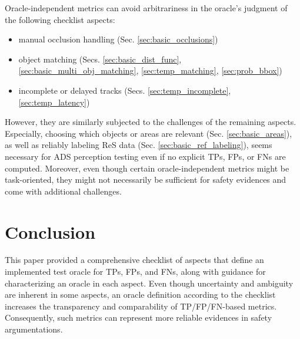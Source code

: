 \documentclass[conference]{IEEEtran}
\begin{document}
Oracle-independent metrics %
can avoid arbitrariness in the oracle's judgment of the following checklist aspects:
\begin{itemize}
\item manual occlusion handling (Sec. \ref{sec:basic_occlusions})
\item object matching (Secs. \ref{sec:basic_dist_func}, \ref{sec:basic_multi_obj_matching},
\ref{sec:temp_matching},
 \ref{sec:prob_bbox})
\item incomplete or delayed tracks (Secs. \ref{sec:temp_incomplete}, \ref{sec:temp_latency})
\end{itemize}
However, they are similarly subjected to the challenges of the remaining aspects.
Especially, choosing which objects or areas are relevant (Sec. \ref{sec:basic_areas}), as well as reliably labeling ReS data (Sec. \ref{sec:basic_ref_labeling}), seems necessary for ADS perception testing even if no explicit TPs, FPs, or FNs are computed. %
Moreover, even though certain oracle-independent metrics might be task-oriented, %
they might not necessarily be sufficient for safety evidences and come with additional challenges.


\section{Conclusion}
\label{sec:conclusion}

This paper provided a comprehensive checklist of aspects that define an implemented test oracle for TPs, FPs, and FNs, along with guidance for characterizing an oracle in each aspect.
Even though uncertainty and ambiguity are inherent in some aspects, an oracle definition according to the checklist increases the transparency and comparability of TP/FP/FN-based metrics.
Consequently, such metrics can represent more reliable evidences in safety argumentations.
\end{document}
